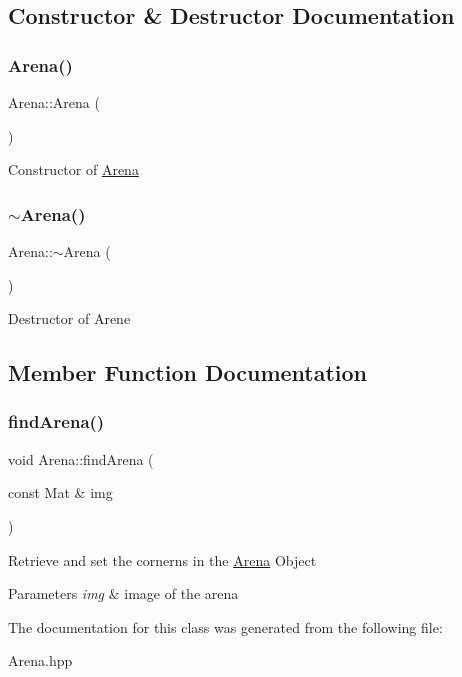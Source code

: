 \subsection{Constructor \& Destructor Documentation}
\mbox{\label{class_arena_a74f105bc709d4728fb07f1984abfd345}} 
\subsubsection{\texorpdfstring{Arena()}{Arena()}}
{\footnotesize\ttfamily Arena\+::\+Arena (\begin{DoxyParamCaption}{ }\end{DoxyParamCaption})}

Constructor of \mbox{\hyperlink{class_arena}{Arena}} \mbox{\label{class_arena_ae21b399e9e3f6b8ac4ecc44d7d1667fc}} 
\subsubsection{\texorpdfstring{$\sim$\+Arena()}{~Arena()}}
{\footnotesize\ttfamily Arena\+::$\sim$\+Arena (\begin{DoxyParamCaption}{ }\end{DoxyParamCaption})}

Destructor of Arene 

\subsection{Member Function Documentation}
\mbox{\label{class_arena_aa37acdf43108ab0da04b77bbf79c2f7d}} 
\subsubsection{\texorpdfstring{find\+Arena()}{findArena()}}
{\footnotesize\ttfamily void Arena\+::find\+Arena (\begin{DoxyParamCaption}\item[{const Mat \&}]{img }\end{DoxyParamCaption})}

Retrieve and set the cornerns in the \mbox{\hyperlink{class_arena}{Arena}} Object 
\begin{DoxyParams}{Parameters}
{\em img} & image of the arena \\
\hline
\end{DoxyParams}


The documentation for this class was generated from the following file\+:\begin{DoxyCompactItemize}
\item 
Arena.\+hpp\end{DoxyCompactItemize}
